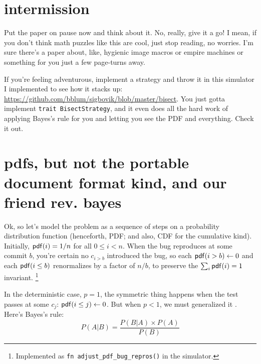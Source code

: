 \documentclass[11pt]{sigplanconf}
\begin{document}

\section{intermission}

Put the paper on pause now and think about it.
No, really, give it a go!
I mean, if you don't think math puzzles like this are cool, just stop reading, no worries.
I'm sure there's a paper about, like, hygienic image macros or empire machines or something for you just a few page-turns away.

If you're feeling adventurous,
implement a strategy and throw it in this simulator I implemented to see how it stacks up:
\url{https://github.com/bblum/sigbovik/blob/master/bisect}.
You just gotta implement {\tt trait BisectStrategy},
and it even does all the hard work of applying Bayes's rule
for you and letting you see the PDF and everything.
Check it out.



\section{pdfs, but not the portable document format kind, and our friend rev. bayes}

Ok, so let's model the problem as a sequence of steps on a probability distribution function
(henceforth, PDF; and also, CDF for the cumulative kind).
Initially, $\mathsf{pdf}(i) = 1/n$ for all $0 \le i < n$.
When the bug reproduces at some commit $b$,
you're certain no $c_{i>b}$ introduced the bug, so each $\mathsf{pdf}(i>b) \leftarrow 0$
and each $\mathsf{pdf}(i\le b)$ renormalizes by a factor of $n/b$, to preserve the
$\sum_i \mathsf{pdf}(i) = 1$
invariant.%
\footnote{Implemented as {\tt fn adjust\_pdf\_bug\_repros()} in the simulator.}

In the deterministic case, $p=1$,
the symmetric thing happens when the test passes at some $c_j$: $\mathsf{pdf}(i\le j) \leftarrow 0$.
But when $p<1$, we must generalized it \cite{mario3}. Here's Bayes's rule:
\[
P(A|B) = \frac{P(B|A) \times P(A)}{P(B)}
\]

\newcommand\renorm[1]{\ensuremath{\mathcal{R}_{#1}}\xspace}
\end{document}
